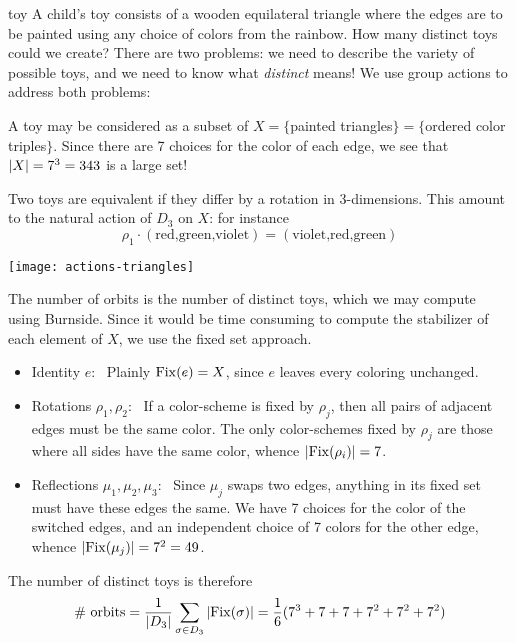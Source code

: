 \begin{example}{}{toy}
A child's toy consists of a wooden equilateral triangle where the edges are to be painted using any choice of colors from the rainbow. How many distinct toys could we create?\smallbreak
There are two problems: we need to describe the variety of possible toys, and we need to know what \emph{distinct} means!\smallbreak
We use group actions to address both problems:
\begin{itemize}
  \item A toy may be considered as a subset of $X=\{$painted triangles$\}=\{$ordered color triples$\}$. Since there are 7 choices for the color of each edge, we see that $\left| X\right|=7^3=343$ is a large set!
\begin{minipage}[t]{0.55\linewidth}\vspace{0pt}
  \item Two toys are equivalent if they differ by a rotation in 3-dimensions. This amount to the natural action of $D_3$ on $X$: for instance
  \[\rho_1\cdot (\text{red,green,violet})=(\text{violet,red,green})\]
\end{minipage}\hfill\begin{minipage}[t]{0.4\linewidth}\vspace{0pt}
\hfill\texttt{[image: actions-triangles]}
\end{minipage}
\end{itemize}
The number of orbits is the number of distinct toys, which we may compute using Burnside. Since it would be time consuming to compute the stabilizer of each element of $X$, we use the fixed set approach.
\begin{itemize}
  \item Identity $e$: \ Plainly $\operatorname{Fix}(e)=X$, since $e$ leaves every coloring unchanged.
  \item Rotations $\rho_1,\rho_2$: \ If a color-scheme is fixed by $\rho_j$, then all pairs of adjacent edges must be the same color. The only color-schemes fixed by $\rho_j$ are those where all sides have the same color, whence $\left| \operatorname{Fix}(\rho_i)\right|=7$.
  \item Reflections $\mu_1,\mu_2,\mu_3$: \ Since $\mu_j$ swaps two edges, anything in its fixed set must have these edges the same. We have 7 choices for the color of the switched edges, and an independent choice of 7 colors for the other edge, whence $\left| \operatorname{Fix}(\mu_j)\right|=7^2=49$.
\end{itemize}
The number of distinct toys is therefore
\begin{align*}
\text{\# orbits}&=\frac 1{\nm{D_3}}\sum_{\sigma\in D_3}\nm{\Fix(\sigma)}=\frac 16(7^3+7+7+7^2+7^2+7^2)\\

\end{align*}
\end{example}
